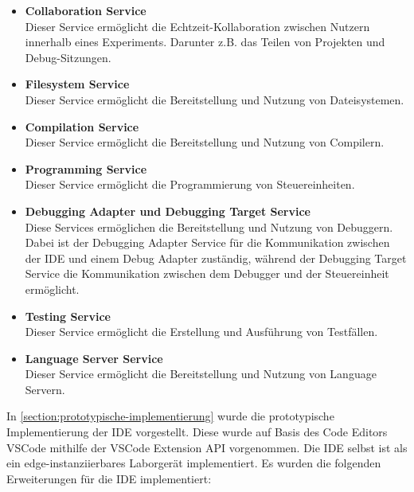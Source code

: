 \begin{itemize}
    \item \textbf{Collaboration Service} \\ Dieser Service ermöglicht die Echtzeit-Kollaboration zwischen Nutzern innerhalb eines Experiments. Darunter z.B. das Teilen von Projekten und Debug-Sitzungen.
          \newpage
    \item \textbf{Filesystem Service} \\ Dieser Service ermöglicht die Bereitstellung und Nutzung von Dateisystemen.
    \item \textbf{Compilation Service} \\ Dieser Service ermöglicht die Bereitstellung und Nutzung von Compilern.
    \item \textbf{Programming Service} \\ Dieser Service ermöglicht die Programmierung von Steuereinheiten.
    \item \textbf{Debugging Adapter und Debugging Target Service} \\ Diese Services ermöglichen die Bereitstellung und Nutzung von Debuggern. Dabei ist der Debugging Adapter Service für die Kommunikation zwischen der IDE und einem Debug Adapter zuständig, während der Debugging Target Service die Kommunikation zwischen dem Debugger und der Steuereinheit ermöglicht.
    \item \textbf{Testing Service} \\ Dieser Service ermöglicht die Erstellung und Ausführung von Testfällen.
    \item \textbf{Language Server Service} \\ Dieser Service ermöglicht die Bereitstellung und Nutzung von Language Servern.
\end{itemize}

In \autoref{section:prototypische-implementierung} wurde die prototypische Implementierung der IDE vorgestellt. Diese wurde auf Basis des Code Editors \ac{VSCode} mithilfe der VSCode Extension API vorgenommen. Die IDE selbst ist als ein edge-instanziierbares Laborgerät implementiert. Es wurden die folgenden Erweiterungen für die IDE implementiert:

